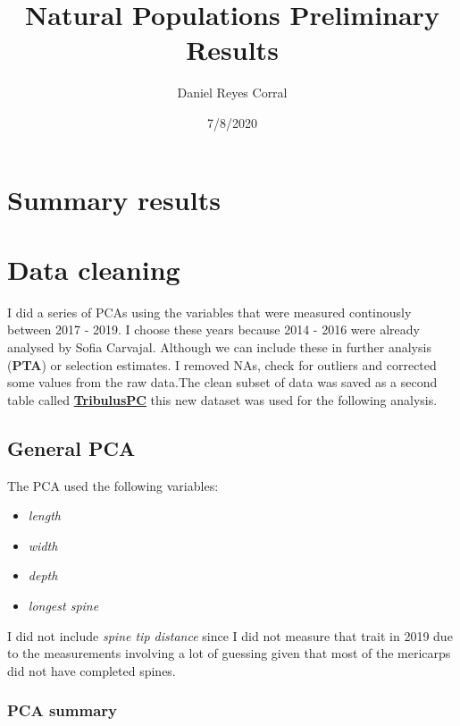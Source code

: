 \documentclass[
]{article}
\title{Natural Populations Preliminary Results}
\author{Daniel Reyes Corral}
\date{7/8/2020}
\providecommand{\tightlist}{%
  \setlength{\itemsep}{0pt}\setlength{\parskip}{0pt}}
\begin{document}
\maketitle

\hypertarget{summary-results}{%
\section{Summary results}\label{summary-results}}

\hypertarget{data-cleaning}{%
\section{Data cleaning}\label{data-cleaning}}

I did a series of PCAs using the variables that were measured
continously between 2017 - 2019. I choose these years because 2014 -
2016 were already analysed by Sofia Carvajal. Although we can include
these in further analysis (\textbf{PTA}) or selection estimates. I
removed NAs, check for outliers and corrected some values from the raw
data.The clean subset of data was saved as a second table called
\href{https://github.com/Winer-DanielR/Tribulus-Natural-population/tree/master/Data/Processed}{\textbf{TribulusPC}}
this new dataset was used for the following analysis.

\hypertarget{general-pca}{%
\subsection{General PCA}\label{general-pca}}

The PCA used the following variables:

\begin{itemize}
\tightlist
\item
  \emph{length}
\item
  \emph{width}
\item
  \emph{depth}
\item
  \emph{longest spine}
\end{itemize}

I did not include \emph{spine tip distance} since I did not measure that
trait in 2019 due to the measurements involving a lot of guessing given
that most of the mericarps did not have completed spines.

\hypertarget{pca-summary}{%
\subsubsection{PCA summary}\label{pca-summary}}
\end{document}
